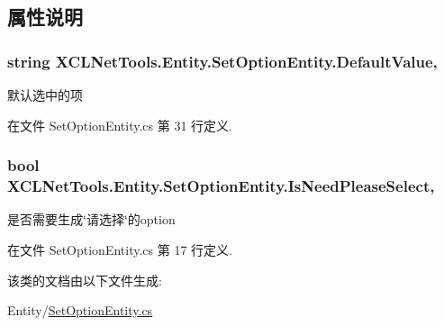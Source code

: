 \subsection{属性说明}
\hypertarget{class_x_c_l_net_tools_1_1_entity_1_1_set_option_entity_a504fe6ad96f52cb7eb9f8a4e64e07723}{
\subsubsection[{Default\-Value}]{\setlength{\rightskip}{0pt plus 5cm}string X\-C\-L\-Net\-Tools.\-Entity.\-Set\-Option\-Entity.\-Default\-Value\hspace{0.3cm}{\ttfamily [get]}, {\ttfamily [set]}}}\label{class_x_c_l_net_tools_1_1_entity_1_1_set_option_entity_a504fe6ad96f52cb7eb9f8a4e64e07723}


默认选中的项 



在文件 Set\-Option\-Entity.\-cs 第 31 行定义.

\hypertarget{class_x_c_l_net_tools_1_1_entity_1_1_set_option_entity_a22c7d14f09183bb9124fa9219663be6c}{
\subsubsection[{Is\-Need\-Please\-Select}]{\setlength{\rightskip}{0pt plus 5cm}bool X\-C\-L\-Net\-Tools.\-Entity.\-Set\-Option\-Entity.\-Is\-Need\-Please\-Select\hspace{0.3cm}{\ttfamily [get]}, {\ttfamily [set]}}}\label{class_x_c_l_net_tools_1_1_entity_1_1_set_option_entity_a22c7d14f09183bb9124fa9219663be6c}


是否需要生成\char`\"{}请选择\char`\"{}的option 



在文件 Set\-Option\-Entity.\-cs 第 17 行定义.



该类的文档由以下文件生成\-:\begin{DoxyCompactItemize}
\item 
Entity/\hyperlink{_set_option_entity_8cs}{Set\-Option\-Entity.\-cs}\end{DoxyCompactItemize}
